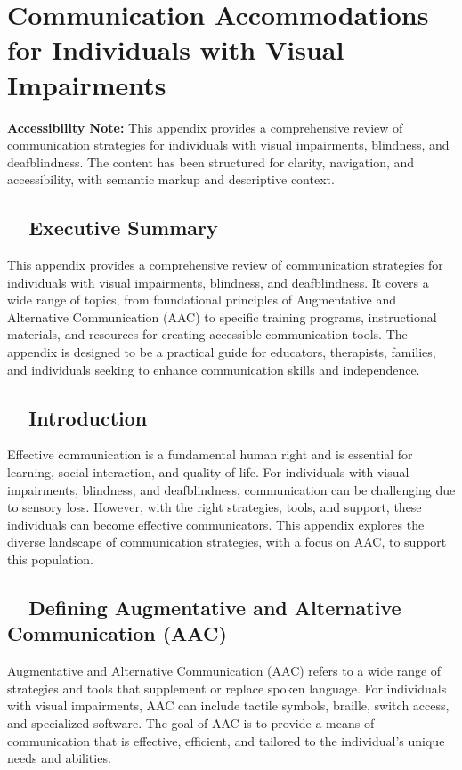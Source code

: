 \chapter{Communication Accommodations for Individuals with Visual Impairments}\label{app6:appx6}

\begin{raggedright}
	\textbf{Accessibility Note:} This appendix provides a comprehensive review of communication strategies for individuals with visual impairments, blindness, and deafblindness. The content has been structured for clarity, navigation, and accessibility, with semantic markup and descriptive context.
\end{raggedright}

\section{~~Executive Summary}\label{app6:exec-summary}
This appendix provides a comprehensive review of communication strategies for individuals with visual impairments, blindness, and deafblindness. It covers a wide range of topics, from foundational principles of Augmentative and Alternative Communication (AAC) to specific training programs, instructional materials, and resources for creating accessible communication tools. The appendix is designed to be a practical guide for educators, therapists, families, and individuals seeking to enhance communication skills and independence.

\section{~~Introduction}\label{app6:intro}
Effective \gls{communication} is a fundamental human right and is essential for learning, social interaction, and quality of life. For individuals with visual impairments, blindness, and deafblindness, \gls{communication} can be challenging due to sensory loss. However, with the right strategies, tools, and support, these individuals can become effective communicators. This appendix explores the diverse landscape of \gls{communication} strategies, with a focus on AAC, to support this population.

\section{~~Defining Augmentative and Alternative Communication (AAC)}\label{app6:define-aac}
Augmentative and Alternative Communication (AAC) refers to a wide range of strategies and tools that supplement or replace spoken language. For individuals with visual impairments, AAC can include tactile symbols, braille, switch access, and specialized software. The goal of AAC is to provide a means of communication that is effective, efficient, and tailored to the individual's unique needs and abilities.

